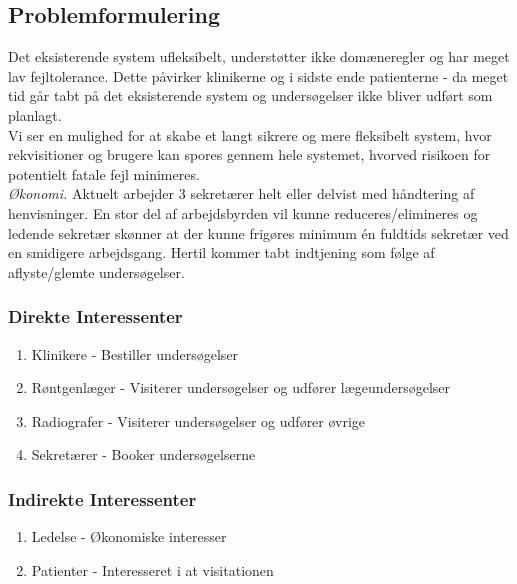 \subsection*{Problemformulering}
Det eksisterende system ufleksibelt, understøtter ikke domæneregler og har meget
lav fejltolerance. Dette påvirker klinikerne og i sidste ende patienterne - da
meget tid går tabt på det eksisterende system og undersøgelser ikke bliver
udført som planlagt.\\
\indent Vi ser en mulighed for at skabe et langt sikrere og mere fleksibelt
system, hvor rekvisitioner og brugere kan spores gennem hele systemet, hvorved
risikoen for potentielt fatale fejl minimeres.\\
\indent \emph{Økonomi.} Aktuelt arbejder 3 sekretærer helt eller delvist med
håndtering af henvisninger. En stor del af arbejdsbyrden vil kunne
reduceres/elimineres og ledende sekretær skønner at der kunne frigøres minimum
én fuldtids sekretær ved en smidigere arbejdsgang. Hertil kommer tabt indtjening
som følge af aflyste/glemte undersøgelser.\\
\subsubsection*{Direkte Interessenter}
\begin{enumerate}
  \item Klinikere - Bestiller undersøgelser
  \item Røntgenlæger - Visiterer undersøgelser og udfører lægeundersøgelser
  \item Radiografer - Visiterer undersøgelser og udfører øvrige
  \item Sekretærer - Booker undersøgelserne
\end{enumerate}

\subsubsection*{Indirekte Interessenter}
\begin{enumerate}
  \item Ledelse - Økonomiske interesser
  \item Patienter - Interesseret i at visitationen
\end{enumerate}
